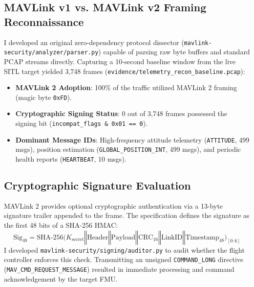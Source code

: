 \documentclass[11pt,a4paper]{article}
\begin{document}
\subsection{MAVLink v1 vs. MAVLink v2 Framing Reconnaissance}
I developed an original zero-dependency protocol dissector (\texttt{mavlink-security/analyzer/parser.py}) capable of parsing raw byte buffers and standard PCAP streams directly. Capturing a 10-second baseline window from the live SITL target yielded 3,748 frames (\texttt{evidence/telemetry\_recon\_baseline.pcap}):
\begin{itemize}
    \item \textbf{MAVLink 2 Adoption}: 100\% of the traffic utilized MAVLink 2 framing (magic byte \texttt{0xFD}).
    \item \textbf{Cryptographic Signing Status}: 0 out of 3,748 frames possessed the signing bit (\texttt{incompat\_flags \& 0x01 == 0}).
    \item \textbf{Dominant Message IDs}: High-frequency attitude telemetry (\texttt{ATTITUDE}, 499 msgs), position estimation (\texttt{GLOBAL\_POSITION\_INT}, 499 msgs), and periodic health reports (\texttt{HEARTBEAT}, 10 msgs).
\end{itemize}

\subsection{Cryptographic Signature Evaluation}
MAVLink 2 provides optional cryptographic authentication via a 13-byte signature trailer appended to the frame. The specification defines the signature as the first 48 bits of a SHA-256 HMAC:
\begin{equation}
    \text{Sig}_{48} = \text{SHA-256}\Big(K_{\text{secret}} \mathbin{\Vert} \text{Header} \mathbin{\Vert} \text{Payload} \mathbin{\Vert} \text{CRC}_{16} \mathbin{\Vert} \text{LinkID} \mathbin{\Vert} \text{Timestamp}_{48}\Big)_{[0:6]}
\end{equation}
I developed \texttt{mavlink-security/signing/auditor.py} to audit whether the flight controller enforces this check. Transmitting an unsigned \texttt{COMMAND\_LONG} directive (\texttt{MAV\_CMD\_REQUEST\_MESSAGE}) resulted in immediate processing and command acknowledgement by the target FMU.
\end{document}
